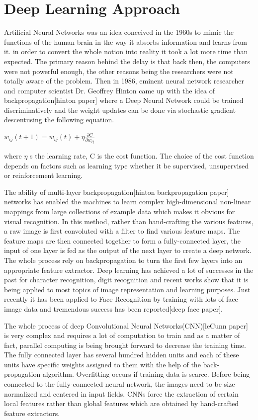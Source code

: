 \section{Deep Learning Approach} \label{sec:build4}

Artificial Neural Networks was an idea conceived  in the 1960s to mimic the functions of the human brain in the way it absorbs information and learns from it. in order to  convert the whole notion into reality it took a lot more time than expected. The primary reason behind the delay is that back then, the computers were not powerful enough, the other reasons being the researchers were not totally aware of the problem. Then in 1986, eminent neural network researcher and computer scientist Dr. Geoffrey Hinton came up with the idea of backpropagation[hinton paper] where a Deep Neural Network could be trained discriminatively and the weight updates can be done via stochastic gradient descentusing the following equation.

\begin{center}
	$w_{ij}(t+1) = w_{ij}(t) + \eta \frac{\partial C}{\partial w_{ij}}$
\end{center}
where $\eta$ s the learning rate, C is the cost function. The choice of the cost function depends on factors such as learning type whether it be supervised, unsupervised or reinforcement learning. 

The ability of multi-layer backpropagation[hinton backpropagation paper] networks has enabled the machines to learn complex high-dimensional non-linear mappings from large collections of example data which makes it obvious for visual recognition. In this method, rather than hand-crafting the various features, a raw image is first convoluted with a filter to find various feature maps. The feature maps are then connected together to form a fully-connected layer, the input of one layer is fed as the output of the next layer to create a deep network. The whole process rely on backpropagation to turn the first few layers into an appropriate feature extractor. Deep learning has achieved a lot of successes in the past for character recognition, digit recognition and recent works show that it is being applied to most topics of image representation and learning purposes. Just recently it has been applied to Face Recognition by training with lots of face image data and tremendous success has been reported[deep face paper].

The whole process of deep Convolutional Neural Networks(CNN)[leCunn paper] is very complex and requires a lot of computation to train and as a matter of fact, parallel computing is being brought forward to decrease the training time. The fully connected layer has several hundred hidden units and each of these units have specific weights assigned to them with the help of the back-propagation algorithm. Overfitting occurs if training data is scarce. Before being connected to the fully-connected neural network, the images need to be size normalized and centered in input fields. CNNs force the extraction of certain local features rather than global features which are obtained by hand-crafted feature extractors.

